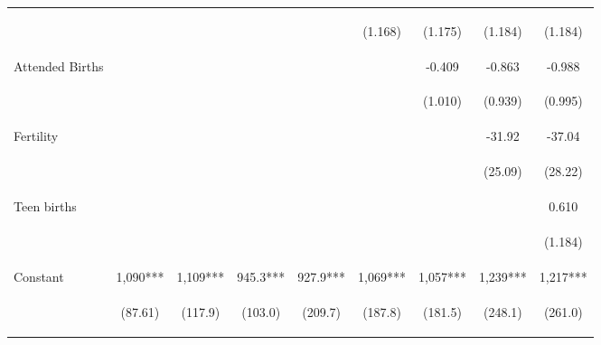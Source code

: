 \begin{table}[htpb!]
\begin{center}
\begin{tabular}{lcccccccc}
&&&&&\begin{footnotesize}(1.168)\end{footnotesize}&\begin{footnotesize}(1.175)\end{footnotesize}&\begin{footnotesize}(1.184)\end{footnotesize}&\begin{footnotesize}(1.184)\end{footnotesize}\\
Attended Births&&&&&&-0.409&-0.863&-0.988\\
&&&&&&\begin{footnotesize}(1.010)\end{footnotesize}&\begin{footnotesize}(0.939)\end{footnotesize}&\begin{footnotesize}(0.995)\end{footnotesize}\\
Fertility&&&&&&&-31.92&-37.04\\
&&&&&&&\begin{footnotesize}(25.09)\end{footnotesize}&\begin{footnotesize}(28.22)\end{footnotesize}\\
Teen births&&&&&&&&0.610\\
&&&&&&&&\begin{footnotesize}(1.184)\end{footnotesize}\\
Constant&1,090***&1,109***&945.3***&927.9***&1,069***&1,057***&1,239***&1,217***\\
&\begin{footnotesize}(87.61)\end{footnotesize}&\begin{footnotesize}(117.9)\end{footnotesize}&\begin{footnotesize}(103.0)\end{footnotesize}&\begin{footnotesize}(209.7)\end{footnotesize}&\begin{footnotesize}(187.8)\end{footnotesize}&\begin{footnotesize}(181.5)\end{footnotesize}&\begin{footnotesize}(248.1)\end{footnotesize}&\begin{footnotesize}(261.0)\end{footnotesize}\\

\end{tabular}
\end{center}
\end{table}
